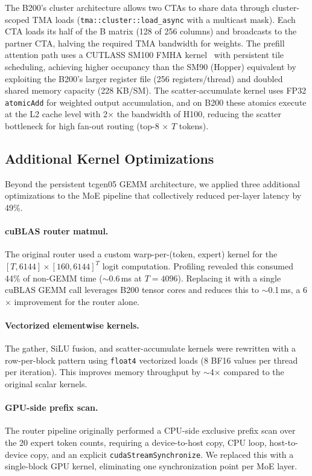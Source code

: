 \documentclass[sigplan,screen]{acmart}
\begin{document}
The B200's cluster architecture allows two CTAs to share data through cluster-scoped TMA loads \newline (\texttt{tma::cluster::load\_async} with a multicast mask). Each CTA loads its half of the B matrix (128 of 256 columns) and broadcasts to the partner CTA, halving the required TMA bandwidth for weights. The prefill attention path uses a CUTLASS SM100 FMHA kernel~\cite{flashattention} with persistent tile scheduling, achieving higher occupancy than the SM90 (Hopper) equivalent by exploiting the B200's larger register file (256 registers/thread) and doubled shared memory capacity (228 KB/SM). The scatter-accumulate kernel uses FP32 \texttt{atomicAdd} for weighted output accumulation, and on B200 these atomics execute at the L2 cache level with 2$\times$ the bandwidth of H100, reducing the scatter bottleneck for high fan-out routing (top-8 $\times$ $T$ tokens).

\subsection{Additional Kernel Optimizations}

Beyond the persistent tcgen05 GEMM architecture, we applied three additional optimizations to the MoE pipeline that collectively reduced per-layer latency by 49\%.

\paragraph{cuBLAS router matmul.} The original router used a custom warp-per-(token, expert) kernel for the \newline $[T, 6144] \times [160, 6144]^T$ logit computation. Profiling revealed this consumed 44\% of non-GEMM time ($\sim$0.6\,ms at $T{=}4096$). Replacing it with a single cuBLAS GEMM call leverages B200 tensor cores and reduces this to $\sim$0.1\,ms, a 6$\times$ improvement for the router alone.

\paragraph{Vectorized elementwise kernels.} The gather, SiLU fusion, and scatter-accumulate kernels were rewritten with a row-per-block pattern using \texttt{float4} vectorized loads (8 BF16 values per thread per iteration). This improves memory throughput by $\sim$4$\times$ compared to the original scalar kernels.

\paragraph{GPU-side prefix scan.} The router pipeline originally performed a CPU-side exclusive prefix scan over the 20 expert token counts, requiring a device-to-host copy, CPU loop, host-to-device copy, and an explicit \texttt{cudaStreamSynchronize}. We replaced this with a single-block GPU kernel, eliminating one synchronization point per MoE layer.
\end{document}
